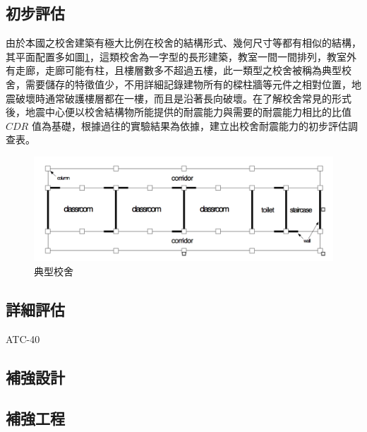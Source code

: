 \subsection{初步評估}

由於本國之校舍建築有極大比例在校舍的結構形式、幾何尺寸等都有相似的結構，其平面配置多如圖\ref{fig:TSB}，這類校舍為一字型的長形建築，教室一間一間排列，教室外有走廊，走廊可能有柱，且樓層數多不超過五樓，此一類型之校舍被稱為典型校舍，需要儲存的特徵值少，不用詳細記錄建物所有的樑柱牆等元件之相對位置，地震破壞時通常破護樓層都在一樓，而且是沿著長向破壞。在了解校舍常見的形式後，地震中心便以校舍結構物所能提供的耐震能力與需要的耐震能力相比的比值 $CDR$ 值為基礎，根據過往的實驗結果為依據，建立出校舍耐震能力的初步評估調查表。

\begin{figure}[t!]
  \begin{center}
    \includegraphics[width=1.0\textwidth]{figures/trad-school-buildings.png}
    \caption{典型校舍} 
    \label{fig:TSB}
  \end{center}
\end{figure}


\subsection{詳細評估}

ATC-40\cite{applied1996seismic}

\subsection{補強設計}

\subsection{補強工程}

